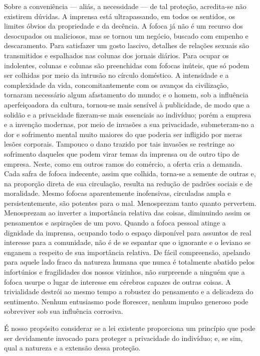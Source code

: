 Sobre a conveniência --- aliás, a necessidade --- de tal proteção,
acredita-se não existirem dúvidas. A imprensa está ultrapassando, em
todos os sentidos, os limites óbvios da propriedade e da decência. A
fofoca já não é um recurso dos desocupados ou maliciosos, mas se tornou
um negócio, buscado com empenho e descaramento. Para satisfazer um gosto
lascivo, detalhes de relações sexuais são transmitidos e espalhados nas
colunas dos jornais diários. Para ocupar os indolentes, colunas e
colunas são preenchidas com fofocas inúteis, que só podem ser colhidas
por meio da intrusão no círculo doméstico. A intensidade e a
complexidade da vida, concomitantemente com os avanços da civilização,
tornaram necessário algum afastamento do mundo; e o homem, sob a
influência aperfeiçoadora da cultura, tornou-se mais sensível à
publicidade, de modo que a solidão e a privacidade fizeram-se mais
essenciais ao indivíduo; porém a empresa e a invenção modernas, por meio
de invasões a sua privacidade, submeteram-no a dor e sofrimento mental
muito maiores do que poderia ser infligido por meras lesões corporais.
Tampouco o dano trazido por tais invasões se restringe ao sofrimento
daqueles que podem virar temas da imprensa ou de outro tipo de empresa.
Neste, como em outros ramos do comércio, a oferta cria a demanda. Cada
safra de fofoca indecente, assim que colhida, torna-se a semente de
outras e, na proporção direta de sua circulação, resulta na redução de
padrões sociais e de moralidade. Mesmo fofocas aparentemente
inofensivas, circuladas ampla e persistentemente, são potentes para o
mal. Menosprezam tanto quanto pervertem. Menosprezam ao inverter a
importância relativa das coisas, diminuindo assim os pensamentos e
aspirações de um povo. Quando a fofoca pessoal atinge a dignidade da
imprensa, ocupando todo o espaço disponível para assuntos de real
interesse para a comunidade, não é de se espantar que o ignorante e o
leviano se enganem a respeito de sua importância relativa. De fácil
compreensão, apelando para aquele lado fraco da natureza humana que
nunca é totalmente abatido pelos infortúnios e fragilidades dos nossos
vizinhos, não surpreende a ninguém que a fofoca usurpe o lugar de
interesse em cérebros capazes de outras coisas. A trivialidade destrói
ao mesmo tempo a robustez do pensamento e a delicadeza do sentimento.
Nenhum entusiasmo pode florescer, nenhum impulso generoso pode
sobreviver sob sua influência corrosiva.

É nosso propósito considerar se a lei existente proporciona um princípio
que pode ser devidamente invocado para proteger a privacidade do
indivíduo; e, se sim, qual a natureza e a extensão dessa proteção.

